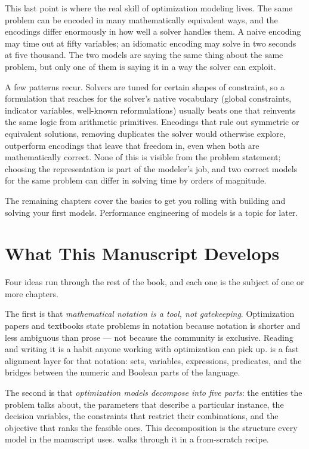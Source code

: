 This last point is where the real skill of optimization modeling lives.
The same problem can be encoded in many mathematically equivalent ways,
and the encodings differ enormously in how well a solver handles them. A
naive encoding may time out at fifty variables; an idiomatic encoding
may solve in two seconds at five thousand. The two models are saying the
same thing about the same problem, but only one of them is saying it in
a way the solver can exploit.

A few patterns recur. Solvers are tuned for certain shapes of
constraint, so a formulation that reaches for the solver's native
vocabulary (global constraints, indicator variables, well-known
reformulations) usually beats one that reinvents the same logic from
arithmetic primitives. Encodings that rule out symmetric or equivalent
solutions, removing duplicates the solver would otherwise explore,
outperform encodings that leave that freedom in, even when both are
mathematically correct. None of this is visible from the problem
statement; choosing the representation is part of the modeler's job, and
two correct models for the same problem can differ in solving time by
orders of magnitude.

The remaining chapters cover the basics to get you rolling with building
and solving your first models. Performance engineering of models is a
topic for later.

\section{What This Manuscript Develops}\label{sec:1.3}

Four ideas run through the rest of the book, and each one is the subject
of one or more chapters.

The first is that \emph{mathematical notation is a tool, not
gatekeeping}. Optimization papers and textbooks state problems in
notation because notation is shorter and less ambiguous than prose ---
not because the community is exclusive. Reading and writing it is a
habit anyone working with optimization can pick up.  is a fast
alignment layer for that notation: sets, variables, expressions,
predicates, and the bridges between the numeric and Boolean parts of the
language.

The second is that \emph{optimization models decompose into five parts}:
the entities the problem talks about, the parameters that describe a
particular instance, the decision variables, the constraints that
restrict their combinations, and the objective that ranks the feasible
ones. This decomposition is the structure every model in the manuscript
uses.  walks through it in a from-scratch recipe.


